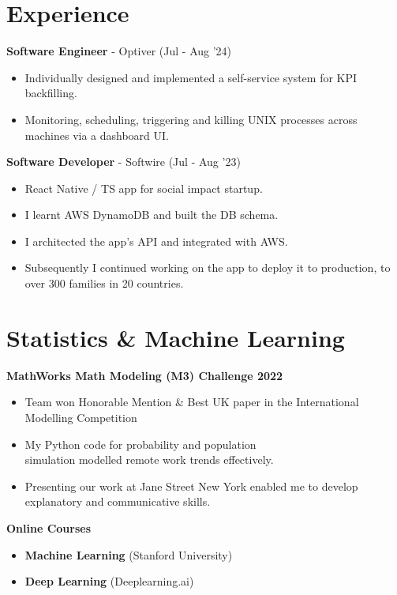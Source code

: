 \documentclass{Resume}
\begin{document}
        \section{Experience}
            \textbf{Software Engineer} - Optiver \hfill (Jul - Aug '24)
                \begin{itemize}
                    \item Individually designed and implemented a self-service system for KPI backfilling.
                    \item Monitoring, scheduling, triggering and killing UNIX processes across machines via a dashboard UI.
                \end{itemize}            
            \textbf{Software Developer} - Softwire \hfill (Jul - Aug '23)
            \begin{itemize}
                \item React Native / TS app for social impact startup.
                \item I learnt AWS DynamoDB and built the DB schema.
                \item I architected the app's API and integrated with AWS.
                \item Subsequently I continued working on the app to deploy it to production, to over 300 families in 20 countries.  

            \end{itemize}

	\section{Statistics \& Machine Learning}
			\textbf{MathWorks Math Modeling (M3) Challenge 2022} 
			\begin{itemize}
                \item Team won Honorable Mention \& Best UK paper in the International Modelling Competition
			    \item My Python code for probability and population \\ simulation modelled remote work trends effectively.
			    \item Presenting our work at Jane Street New York enabled me to develop explanatory and communicative skills.
			\end{itemize}
            \textbf{Online Courses}
                \begin{itemize}
                    \item \textbf{Machine Learning} (Stanford University)
                    \item \textbf{Deep Learning} (Deeplearning.ai)
                \end{itemize}
\end{document}
